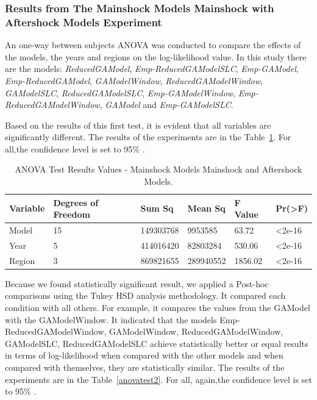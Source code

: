\subsubsection{Results from The Mainshock Models Mainshock with Aftershock Models Experiment}\label{resultsBigExp}

An one-way between subjects ANOVA was conducted to compare the effects of the models, the years and regions on the log-likelihood value. In this study there are the models: \textit{ReducedGAModel}, \textit{Emp-ReducedGAModelSLC}, \textit{Emp-GAModel}, \textit{Emp-ReducedGAModel}, \textit{GAModelWindow}, \textit{ReducedGAModelWindow}, \textit{GAModelSLC}, \textit{ReducedGAModelSLC}, \textit{Emp-GAModelWindow}, \textit{Emp-ReducedGAModelWindow}, \textit{GAModel} and \textit{Emp-GAModelSLC}.

Based on the results of this first test, it is evident that all variables are significantly different. The results of the experiments are in the Table~\ref{anovatest1}. For all,the confidence level is set to 95\% .

\begin{table}[!htb]
	\centering
	\begin{tabular}{|l|l|l|l|l|l|}
		\hline
		{Variable} & {Degrees of Freedom} & {Sum Sq}    & {Mean Sq}   & {F Value} & {Pr(\textgreater F)} \\
		\hline
		Model    & 15           	  & 149303768  & 9953585   & 63.72    & \textless2e-16     \\
		\hline
		Year     & 5                  & 414016420  & 82803284  & 530.06   & \textless2e-16     \\
		\hline
		Region   & 3                  & 869821655  & 289940552  & 1856.02   & \textless2e-16	\\    
		\hline
	\end{tabular}
	\caption{ANOVA Test Results Values - Mainshock Models Mainshock and Aftershock Models.}
	\label{anovatest1}
\end{table}

Because we found statistically significant result, we applied a Post-hoc comparisons using the Tukey HSD analysis methodology. It compared each condition with all others. For example, it compares the values from the GAModel with the GAModelWindow. It indicated that the models Emp-ReducedGAModelWindow, GAModelWindow, ReducedGAModelWindow, GAModelSLC, ReducedGAModelSLC achieve statistically better or equal results in terms of log-likelihood when compared with the other models and when compared with themselves, they are statistically similar. The results of the experiments are in the Table~\ref{anovatest2}. For all, again,the confidence level is set to 95\% .
     
